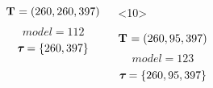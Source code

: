 \begin{frame}
\begin{columns}[c]
\begin{onlyenv}
            \begin{minipage}[c][0.5\textheight][c]{\linewidth}
                \begin{displaybox}[0.95\linewidth]
                    \begin{minipage}[c][0.45\textheight][c]{0.95\linewidth}
                        \[
                            \mathbf{T_{}} = (260,260,397)
                        \]\vspace{0mm}
                        \[
                            model = 112
                        \]\vspace{0mm}
                        \[
                            \boldsymbol{\tau_{}} = \{260,397\}
                        \]\vspace{0mm}
                    \end{minipage}
                \end{displaybox}
            \end{minipage}
        \end{onlyenv}
        \begin{onlyenv}<10>
            \begin{minipage}[c][0.5\textheight][c]{\linewidth}
                \begin{displaybox}[0.95\linewidth]
                    \begin{minipage}[c][0.45\textheight][c]{0.95\linewidth}
                        \[
                            \mathbf{T_{}} = (260,95,397)
                        \]\vspace{0mm}
                        \[
                            model = 123
                        \]\vspace{0mm}
                        \[
                            \boldsymbol{\tau_{}} = \{260,95,397\}
                        \]\vspace{0mm}
                    \end{minipage}
                \end{displaybox}
            \end{minipage}
        \end{onlyenv}

\end{columns}
\end{frame}

